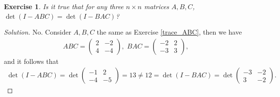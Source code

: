 \documentclass[11pt]{book}
\newtheorem{exercise}{Exercise}[section]
\theoremstyle{definition}
\numberwithin{equation}{chapter}
\begin{document}
\begin{exercise}
Is it true that for any three $n \times n$ matrices $A, B, C$, $\det (I - ABC) = \det (I - BAC)$?
\end{exercise}
\begin{proof}[Solution]
No. Consider $A, B, C$ the same as Exercise \ref{trace_ABC}, then we have
\begin{align*}
    ABC = \begin{pmatrix}
        2 & -2 \\
        4 & -4
    \end{pmatrix}, \,\, BAC = \begin{pmatrix}
        -2 & 2 \\
        -3 & 3
    \end{pmatrix},
\end{align*}
and it follows that
\begin{align*}
    \det (I - ABC) = \det \begin{pmatrix}
        -1 & 2 \\
        -4 & -5
    \end{pmatrix} = 13 \neq 12 = \det (I - BAC) = \det \begin{pmatrix}
        -3 & -2 \\
        3 & -2
    \end{pmatrix}.
\end{align*}
\end{proof}

\medskip
\end{document}
